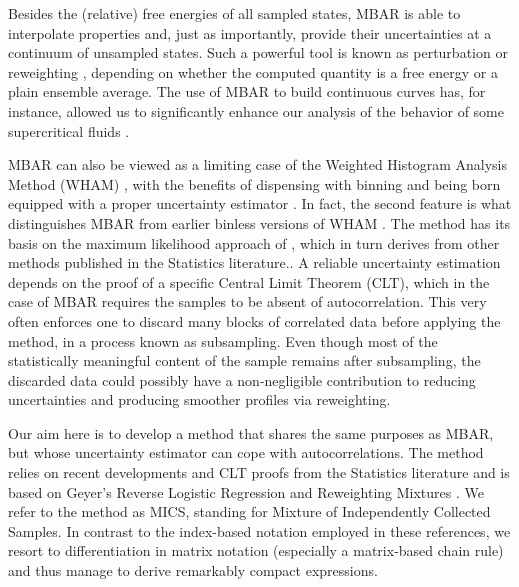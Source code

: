 \documentclass[journal=jctcce,manuscript=article,layout=twocolumn]{achemso}
\begin{document}
Besides the (relative) free energies of all sampled states, MBAR is able to interpolate properties and, just as importantly, provide their uncertainties at a continuum of unsampled states. Such a powerful tool is known as perturbation \cite{Zwanzig_1954} or reweighting \cite{McDonald_1967, McDonald_1969}, depending on whether the computed quantity is a free energy or a plain ensemble average. The use of MBAR to build continuous curves has, for instance, allowed us to significantly enhance our analysis of the behavior of some supercritical fluids \cite{Aimoli_2014, Aimoli_2014_2, Nichele_2018}.

MBAR can also be viewed as a limiting case of the Weighted Histogram Analysis Method (WHAM) \cite{Kumar_1992}, with the benefits of dispensing with binning \cite{Tan_2012} and being born equipped with a proper uncertainty estimator \cite{Shirts_2008}. In fact, the second feature is what distinguishes MBAR from earlier binless versions of WHAM \cite{Bartels_2000, Souaille_2001}. The method has its basis on the maximum likelihood approach of \citeauthor{Kong_2003} \cite{Kong_2003}, which in turn derives from other methods published in the Statistics literature.\cite{Vardi_1985, Gill_1988, Geyer_1994, Lindsay_1995, Meng_1996}. A reliable uncertainty estimation depends on the proof of a specific Central Limit Theorem (CLT), which in the case of MBAR requires the samples to be absent of autocorrelation. This very often enforces one to discard many blocks of correlated data before applying the method, in a process known as subsampling. Even though most of the statistically meaningful content of the sample remains after subsampling, the discarded data could possibly have a non-negligible contribution to reducing uncertainties and producing smoother profiles via reweighting.

Our aim here is to develop a method that shares the same purposes as MBAR, but whose uncertainty estimator can cope with autocorrelations. The method relies on recent developments and CLT proofs from the Statistics literature\cite{Flegal_2010, Buta_2010, Buta_2011, Doss_2014, Vats_2015, Tan_2015, Roy_2018} and is based on Geyer's Reverse Logistic Regression and Reweighting Mixtures \cite{Geyer_1994}. We refer to the method as MICS, standing for Mixture of Independently Collected Samples. In contrast to the index-based notation employed in these references, we resort to differentiation in matrix notation (especially a matrix-based chain rule) and thus manage to derive remarkably compact expressions.
\end{document}

